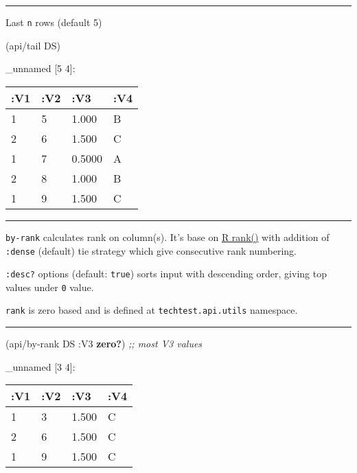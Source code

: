 \documentclass[]{article}
\newenvironment{Shaded}{\begin{snugshade}}{\end{snugshade}}
\newcommand{\KeywordTok}[1]{\textcolor[rgb]{0.13,0.29,0.53}{\textbf{#1}}}
\newcommand{\CommentTok}[1]{\textcolor[rgb]{0.56,0.35,0.01}{\textit{#1}}}
\newcommand{\AttributeTok}[1]{\textcolor[rgb]{0.77,0.63,0.00}{#1}}
\newcommand{\NormalTok}[1]{#1}
\begin{document}
\begin{center}\rule{0.5\linewidth}{0.5pt}\end{center}

Last \texttt{n} rows (default 5)

\begin{Shaded}
\begin{Highlighting}[]
\NormalTok{(api/tail DS)}
\end{Highlighting}
\end{Shaded}

\_unnamed {[}5 4{]}:

\begin{longtable}[]{@{}llll@{}}
\toprule
:V1 & :V2 & :V3 & :V4\tabularnewline
\midrule
\endhead
1 & 5 & 1.000 & B\tabularnewline
2 & 6 & 1.500 & C\tabularnewline
1 & 7 & 0.5000 & A\tabularnewline
2 & 8 & 1.000 & B\tabularnewline
1 & 9 & 1.500 & C\tabularnewline
\bottomrule
\end{longtable}

\begin{center}\rule{0.5\linewidth}{0.5pt}\end{center}

\texttt{by-rank} calculates rank on column(s). It's base on
\href{https://www.rdocumentation.org/packages/base/versions/3.6.1/topics/rank}{R
rank()} with addition of \texttt{:dense} (default) tie strategy which
give consecutive rank numbering.

\texttt{:desc?} options (default: \texttt{true}) sorts input with
descending order, giving top values under \texttt{0} value.

\texttt{rank} is zero based and is defined at
\texttt{techtest.api.utils} namespace.

\begin{center}\rule{0.5\linewidth}{0.5pt}\end{center}

\begin{Shaded}
\begin{Highlighting}[]
\NormalTok{(api/by-rank DS }\AttributeTok{:V3} \KeywordTok{zero?}\NormalTok{) }\CommentTok{;; most V3 values}
\end{Highlighting}
\end{Shaded}

\_unnamed {[}3 4{]}:

\begin{longtable}[]{@{}llll@{}}
\toprule
:V1 & :V2 & :V3 & :V4\tabularnewline
\midrule
\endhead
1 & 3 & 1.500 & C\tabularnewline
2 & 6 & 1.500 & C\tabularnewline
1 & 9 & 1.500 & C\tabularnewline
\bottomrule
\end{longtable}
\end{document}

